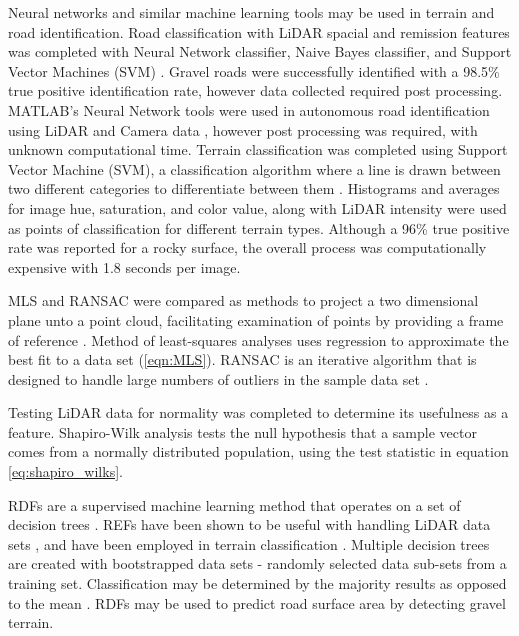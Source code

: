 \documentclass[journal,onecolumn]{IEEEtran}
\begin{document}
{	Neural networks and similar machine learning tools may be used in terrain and road identification. Road classification with LiDAR spacial and remission features was completed with Neural Network classifier, Naive Bayes classifier, and Support Vector Machines (SVM) \cite{wang_road_nodate,wang_two-stage_2018}. Gravel roads were successfully identified with a 98.5\% true positive identification rate, however data collected required post processing. MATLAB's Neural Network tools were used in autonomous road identification using LiDAR and Camera data \cite{rasmussen_combining_2002}, however post processing was required, with unknown computational time.  Terrain classification was completed using Support Vector Machine (SVM), a classification algorithm where a line is drawn between two different categories to differentiate between them \cite{breiman_random_2001}. Histograms and averages for image hue, saturation, and color value, along with LiDAR intensity were used as points of classification for different terrain types. Although a 96\% true positive rate was reported for a rocky surface, the overall process was computationally expensive with 1.8 seconds per image.
	
	MLS and RANSAC were compared as methods to project a two dimensional plane unto a point cloud, facilitating examination of points by providing a frame of reference \cite{miller_method_nodate, gojcic_perfect_2019}. Method of least-squares analyses uses regression to approximate the best fit to a data set (\ref{eqn:MLS}). RANSAC is an iterative algorithm that is designed to handle large numbers of outliers in the sample data set \cite{derpanis_overview_nodate,yaniv_random_2010,fischler_random_1987,cantzler_random_nodate}. 

	{Testing LiDAR data for normality was completed to determine its usefulness as a feature. Shapiro-Wilk analysis \cite{shapiro_analysis_1965, royston_extension_1982} tests the null hypothesis that a sample vector comes from a normally distributed population, using the test statistic in equation \ref{eq:shapiro_wilks}.}


	RDFs are a supervised machine learning method that operates on a set of decision trees \cite{ho_random_1995}. REFs have been shown to be useful with handling LiDAR data sets \cite{breiman_random_2001}, and have been employed in terrain classification \cite{laible_3d_2012,laible_map_building,laible_terrain_2013,khan_high_2011,reymann_improving_2015,schilling_geometric_2017, wietrzykowski_context-aware_2019}. Multiple decision trees are created with bootstrapped data sets - randomly selected data sub-sets from a training set. Classification may be determined by the majority results as opposed to the mean \cite{breiman_random_2001,ho_random_1995}. RDFs may be used to predict road surface area by detecting gravel terrain.

}
\end{document}
